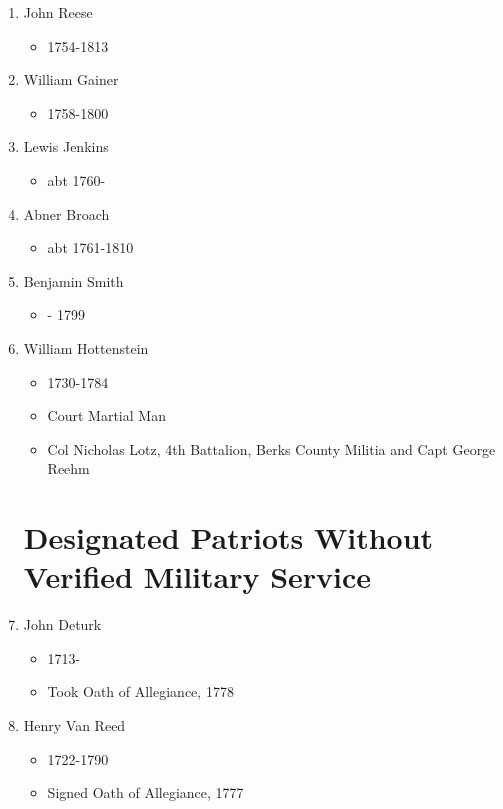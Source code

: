 \documentclass[11pt,letter]{book}
\begin{document}
\begin{enumerate}
\item John Reese
\begin{itemize}
\item 1754-1813
\end{itemize}

\item William Gainer
\begin{itemize}
\item 1758-1800
\end{itemize}

\item Lewis Jenkins
\begin{itemize}
\item abt 1760-
\end{itemize}

\item Abner Broach
\begin{itemize}
\item abt 1761-1810
\end{itemize}

\item Benjamin Smith
\begin{itemize}
\item - 1799
\end{itemize}

\item William Hottenstein
\begin{itemize}
\item 1730-1784
\item Court Martial Man
\item Col Nicholas Lotz, 4th Battalion, Berks County Militia and Capt George Reehm
\end{itemize}

\section{Designated Patriots Without Verified Military Service}

\item John Deturk
\begin{itemize}
\item 1713-
\item Took Oath of Allegiance, 1778
\end{itemize}

\item Henry Van Reed
\begin{itemize}
\item 1722-1790
\item Signed Oath of Allegiance, 1777
\end{itemize}
\end{enumerate}
\end{document}
